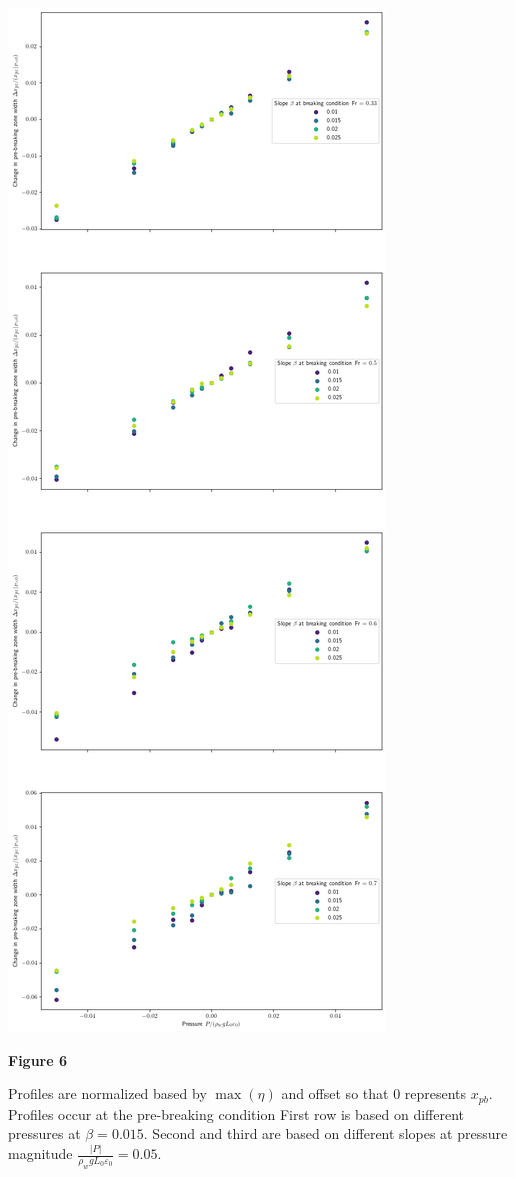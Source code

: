 \documentclass[10pt,a4paper]{article}
\begin{document}
\includegraphics[scale=0.35]{Fig5.png}
\pagebreak


{\bf\huge Figure 6}

Profiles are normalized based by $\max(\eta)$ and offset so that 0 represents $x_{pb}$. Profiles occur at the pre-breaking condition
First row is based on different pressures at $\beta = 0.015$. Second and third are based on different slopes at pressure magnitude $\frac{|P|}{\rho_w g L_0\varepsilon_0} = 0.05$.
\end{document}
